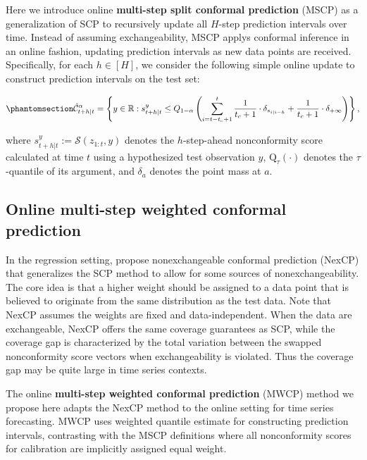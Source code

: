 \documentclass[
  11pt,
  a4paper,
]{article}
\theoremstyle{plain}
\theoremstyle{remark}
\begin{document}
Here we introduce online \textbf{multi-step split conformal prediction}
(MSCP) as a generalization of SCP to recursively update all \(H\)-step
prediction intervals over time. Instead of assuming exchangeability,
MSCP applys conformal inference in an online fashion, updating
prediction intervals as new data points are received. Specifically, for
each \(h \in [H]\), we consider the following simple online update to
construct prediction intervals on the test set:

\begin{equation}\phantomsection\label{eq-mscp}{
\hat{\mathcal{C}}_{t+h|t}^{\alpha} = \left\{y\in\mathbb{R}: s_{t+h|t}^{y} \leq Q_{1-\alpha}\left(\sum_{i=t-t_c+1}^{t}\frac{1}{t_c+1}\cdot\delta_{s_{i|i-h}}+\frac{1}{t_c+1}\cdot\delta_{+\infty}\right)\right\},
}\end{equation}

where \(s_{t+h|t}^{y}:=\mathcal{S}(z_{1:t}, y)\) denotes the
\(h\)-step-ahead nonconformity score calculated at time \(t\) using a
hypothesized test observation \(y\), \(\mathrm{Q}_\tau(\cdot)\) denotes
the \(\tau\)-quantile of its argument, and \(\delta_a\) denotes the
point mass at \(a\).

\subsection{Online multi-step weighted conformal
prediction}\label{online-multi-step-weighted-conformal-prediction}

In the regression setting, \textcite{barber2023} propose nonexchangeable
conformal prediction (NexCP) that generalizes the SCP method to allow
for some sources of nonexchangeability. The core idea is that a higher
weight should be assigned to a data point that is believed to originate
from the same distribution as the test data. Note that NexCP assumes the
weights are fixed and data-independent. When the data are exchangeable,
NexCP offers the same coverage guarantees as SCP, while the coverage gap
is characterized by the total variation between the swapped
nonconformity score vectors when exchangeability is violated. Thus the
coverage gap may be quite large in time series contexts.

The online \textbf{multi-step weighted conformal prediction} (MWCP)
method we propose here adapts the NexCP method to the online setting for
time series forecasting. MWCP uses weighted quantile estimate for
constructing prediction intervals, contrasting with the MSCP definitions
where all nonconformity scores for calibration are implicitly assigned
equal weight.
\end{document}
